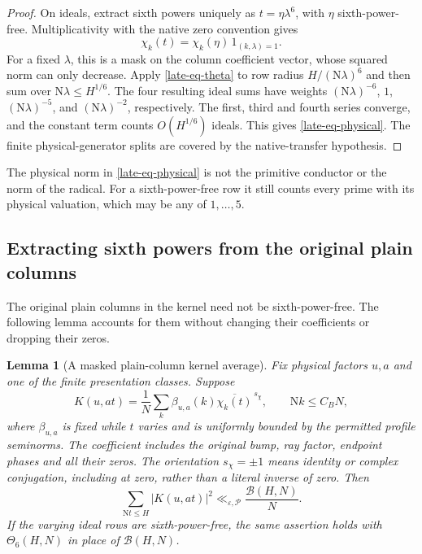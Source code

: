 \documentclass[11pt]{article}
\newtheorem{lemma}[theorem]{Lemma}
\theoremstyle{definition}
\newcommand{\N}{\mathrm N}
\newcommand{\eps}{\varepsilon}
\newcommand{\lls}{\ll_{\eps,\mathcal P}}
\begin{document}
\begin{proof}
On ideals, extract sixth powers uniquely as $t=\eta\lambda^6$, with
$\eta$ sixth-power-free.  Multiplicativity with the native zero
convention gives
\[
 \chi_k(t)=\chi_k(\eta)\,1_{(k,\lambda)=1}.
\]
For a fixed $\lambda$, this is a mask on the column coefficient vector,
whose squared norm can only decrease.  Apply
\eqref{late-eq-theta} to row radius $H/(\N\lambda)^6$ and then sum over
$\N\lambda\le H^{1/6}$.  The four resulting ideal sums have weights
$(\N\lambda)^{-6}$, $1$, $(\N\lambda)^{-5}$, and
$(\N\lambda)^{-2}$, respectively.  The first, third and fourth
series converge, and the constant term counts $O(H^{1/6})$ ideals.
This gives \eqref{late-eq-physical}.  The finite physical-generator
splits are covered by the native-transfer hypothesis.
\end{proof}

The physical norm in \eqref{late-eq-physical} is not the primitive
conductor or the norm of the radical.  For a sixth-power-free row it
still counts every prime with its physical valuation, which may be
any of $1,\ldots,5$.

\subsection{Extracting sixth powers from the original plain columns}
\label{late-subsec-columns}

The original plain columns in the kernel need not be sixth-power-free.
The following lemma accounts for them without changing their
coefficients or dropping their zeros.

\begin{lemma}[A masked plain-column kernel average]
\label{late-lem-kernel}
Fix physical factors $u,a$ and one of the finite presentation classes.
Suppose
\begin{equation}
 K(u,at)=\frac1N\sum_k \beta_{u,a}(k)
                  \overline{\chi_k(t)}^{\,s_\chi},
 \qquad \N k\le C_BN,
 \label{late-eq-beta}
\end{equation}
where $\beta_{u,a}$ is fixed while $t$ varies and is uniformly bounded
by the permitted profile seminorms.  The coefficient includes the
original bump, ray factor, endpoint phases and all their zeros.
The orientation $s_\chi=\pm1$ means identity or complex conjugation,
including at zero, rather than a literal inverse of zero.  Then
\begin{equation}
 \sum_{\N t\le H}|K(u,at)|^2\lls\frac{\mathcal B(H,N)}N.
 \label{late-eq-kernel-physical}
\end{equation}
If the varying ideal rows are sixth-power-free, the same assertion
holds with $\Theta_6(H,N)$ in place of $\mathcal B(H,N)$.
\end{lemma}
\end{document}
